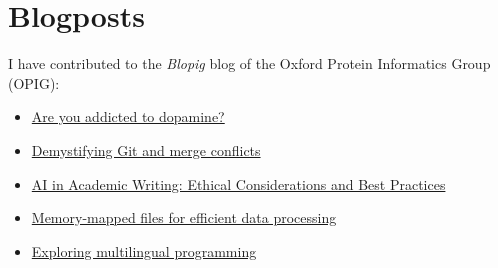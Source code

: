 \section{Blogposts}

I have contributed to the \textit{Blopig} blog of the Oxford Protein Informatics Group (OPIG):

\begin{itemize}
    \item \href{https://www.blopig.com/blog/2025/10/are-you-addicted-to-dopamine/}{Are you addicted to dopamine?}
    \item \href{https://www.blopig.com/blog/2025/05/demystifying-git-and-merge-conflicts/}{Demystifying Git and merge conflicts}
    \item \href{https://www.blopig.com/blog/2025/03/ai-in-academic-writing-ethical-considerations-and-best-practices/}{AI in Academic Writing: Ethical Considerations and Best Practices}
    \item \href{https://www.blopig.com/blog/2024/08/memory-mapped-files-for-efficient-data-processing/}{Memory-mapped files for efficient data processing}
    \item \href{https://www.blopig.com/blog/2024/04/exploring-multilingual-programming/}{Exploring multilingual programming}
\end{itemize}


\appendix

